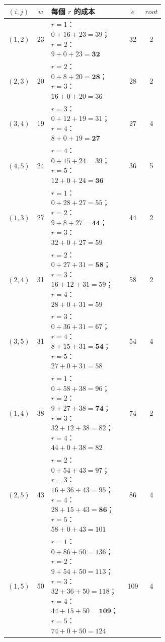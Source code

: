 {\small
\begin{center}
\begin{tabular}{c c p{0.62\linewidth} c c}
\toprule
$(i, j)$ & $w$ & 每個 $r$ 的成本 & $e$ & $\mathit{root}$ \\
\midrule
$(1,2)$ & 23 & $r=1$：$0+16+23=39$；$r=2$：$9+0+23=\mathbf{32}$ & 32 & 2 \\
$(2,3)$ & 20 & $r=2$：$0+8+20=\mathbf{28}$；$r=3$：$16+0+20=36$ & 28 & 2 \\
$(3,4)$ & 19 & $r=3$：$0+12+19=31$；$r=4$：$8+0+19=\mathbf{27}$ & 27 & 4 \\
$(4,5)$ & 24 & $r=4$：$0+15+24=39$；$r=5$：$12+0+24=\mathbf{36}$ & 36 & 5 \\
$(1,3)$ & 27 & $r=1$：$0+28+27=55$；$r=2$：$9+8+27=\mathbf{44}$；$r=3$：$32+0+27=59$ & 44 & 2 \\
$(2,4)$ & 31 & $r=2$：$0+27+31=\mathbf{58}$；$r=3$：$16+12+31=59$；$r=4$：$28+0+31=59$ & 58 & 2 \\
$(3,5)$ & 31 & $r=3$：$0+36+31=67$；$r=4$：$8+15+31=\mathbf{54}$；$r=5$：$27+0+31=58$ & 54 & 4 \\
$(1,4)$ & 38 & $r=1$：$0+58+38=96$；$r=2$：$9+27+38=\mathbf{74}$；$r=3$：$32+12+38=82$；$r=4$：$44+0+38=82$ & 74 & 2 \\
$(2,5)$ & 43 & $r=2$：$0+54+43=97$；$r=3$：$16+36+43=95$；$r=4$：$28+15+43=\mathbf{86}$；$r=5$：$58+0+43=101$ & 86 & 4 \\
$(1,5)$ & 50 & $r=1$：$0+86+50=136$；$r=2$：$9+54+50=113$；$r=3$：$32+36+50=118$；$r=4$：$44+15+50=\mathbf{109}$；$r=5$：$74+0+50=124$ & 109 & 4 \\
\bottomrule
\end{tabular}
\end{center}
}

